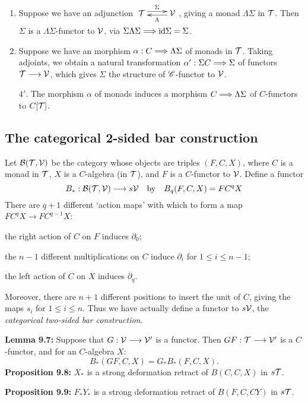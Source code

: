 \documentclass[11pt]{article}
\begin{document}
\begin{chapter7-9}
\begin{itemise}
\begin{exmps*}[9.5]
\begin{enumerate}
\item Suppose we have an adjunction $\xymatrix@R=.3cm{
\calT  \ar@<.6ex>[r]^{\Sigma}&
\calV  \ar@<.4ex>[l]^{\Lambda}}$, giving a monad $\Lambda\Sigma$ in $\mathcal{T}$. Then $\Sigma$ is a $\Lambda\Sigma$-functor to $\mathcal{V}$, via $\Sigma\Lambda\Sigma\Longrightarrow \textup{id}\Sigma=\Sigma$.
\item Suppose we have an morphism $\alpha:C\Longrightarrow\Lambda\Sigma$ of monads in $\mathcal{T}$. Taking adjoints, we obtain a natural transformation $\alpha':\Sigma C\Longrightarrow \Sigma$ of functors $\mathcal{T}\longrightarrow\mathcal{V}$, which gives $\Sigma$ the structure of $\mathscr{C}$-functor to $\mathcal{V}$. 
\item[$4'$.] The morphism $\alpha$ of monads induces a morphism $C\Longrightarrow\Lambda\Sigma$ of $C$-functors to $C[\mathcal{T}]$.
\end{enumerate}
\end{exmps*}
\subsection*{The categorical 2-sided bar construction}
Let $\mathcal{B}(\mathcal{T},\mathcal{V})$ be the category whose objects are triples $(F,C,X)$, where $C$ is a monad in $\mathcal{T}$, $X$ is a $C$-algebra (in $\mathcal{T}$), and $F$ is a $C$-functor to $\mathcal{V}$. Define a functor
\[B_*:\mathcal{B}(\mathcal{T},\mathcal{V})\longrightarrow s\mathcal{V}\textup{\quad by\quad}B_q(F,C,X)=FC^qX\]
There are $q+1$ different `action maps' with which to form a map $FC^qX\to FC^{q-1}X$: 
\begin{itemise}
\item the right action of $C$ on $F$ induces $\partial_0$;
\item the $n-1$ different multiplications on $C$ induce $\partial_i$ for $1\leq i\leq n-1$;
\item the left action of $C$ on $X$ induces $\partial_q$.
\end{itemise}
Moreover, there are $n+1$ different positions to insert the unit of $C$, giving the maps $s_i$ for $1\leq i\leq n$. Thus we have actually define a functor to $s\mathcal{V}$, the \emph{categorical two-sided bar construction}.

\noindent \textbf{\Bullet Lemma 9.7:} Suppose that $G:\mathcal{V}\longrightarrow\mathcal{V}'$ is a functor. Then $GF:\mathcal{T}\longrightarrow\mathcal{V}'$ is a $C$-functor, and for an $C$-algebra $X$:
\[B_*(GF,C,X)=G_*B_*(F,C,X).\]
\textbf{\Bullet Proposition 9.8:} $X_*$ is a strong deformation retract of $B(C,C,X)$ in $s\mathcal{T}$.

\noindent \textbf{\Bullet Proposition 9.9:} $F_*Y_*$ is a strong deformation retract of $B(F,C,CY)$ in $s\mathcal{T}$.


\end{itemise}
\end{chapter7-9}
\end{document}

